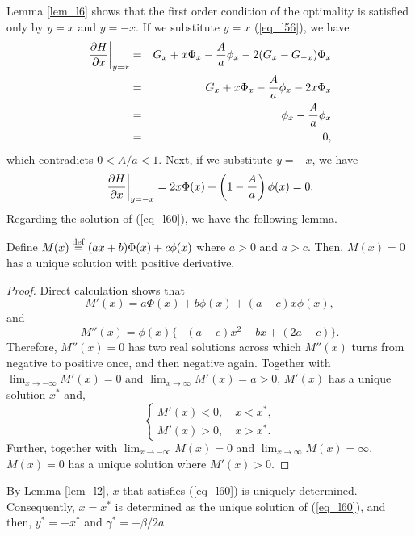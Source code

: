 Lemma \ref{lem_l6} shows that the first order condition of the optimality is satisfied only by $y=x$ and $y=-x$.  If we substitute $y=x$ (\ref{eq_l56}), we have
\begin{eqnarray*}
 \left. \frac{\partial H}{\partial x} \right|_{y=x}
  & = & G_x + x \Phi_x - \frac{A}{a} \phi_x - 2 ( G_x - G_{-x} ) \Phi_x \\
  & = & G_x + x \Phi_x - \frac{A}{a} \phi_x - 2 x\Phi_x \\
  & = & \phi_x - \frac{A}{a} \phi_x \\
  & = & 0,
\end{eqnarray*}
which contradicts $0<A/a<1$.  Next, if we substitute $y=-x$, we have
\begin{equation}\label{eq_l60}
  \left. \frac{\partial H}{\partial x} \right|_{y=-x} = 2 x \Phi(x) + \left( 1 - \frac{A}{a} \right) \phi(x) = 0.
\end{equation}
Regarding the solution of (\ref{eq_l60}), we have the following lemma.
\begin{lemma}\label{lem_l2}
 \quad Define $M(x) \stackrel{\mathrm{def}}{=} (ax+b)\Phi(x)+c\phi(x)$ where $a>0$ and $a>c$.  Then, $M(x)=0$ has a unique solution with positive derivative.
\end{lemma}
\begin{proof}
Direct calculation shows that
\[ %
  M'(x)=a\Phi(x)+b\phi(x)+(a-c)x\phi(x),
\] %
and
\[ %
  M''(x)=\phi(x)\{-(a-c)x^2-bx+(2a-c)\}.
\] %
Therefore, $M''(x)=0$ has two real solutions across which $M''(x)$ turns from negative to positive once, and then negative again.  Together with $\displaystyle \lim_{x \to -\infty} M'(x) =0$ and $\displaystyle \lim_{x \to \infty} M'(x) = a>0$, $M'(x)$ has a unique solution $x^*$ and,
\begin{equation} \label{eq_l63}
 \left\{
  \begin{array}{ll}
   M'(x)<0, \quad x<x^*, \\
   M'(x)>0, \quad x>x^*.
  \end{array}
  \right.
\end{equation}
Further, together with $\displaystyle \lim_{x \to -\infty} M(x) =0$ and $\displaystyle \lim_{x \to \infty} M(x) = \infty$, $M(x)=0$ has a unique solution where $M'(x)>0$.
\end{proof}

By Lemma \ref{lem_l2}, $x$ that satisfies (\ref{eq_l60}) is uniquely determined.  Consequently, $x=x^*$ is determined as the unique solution of (\ref{eq_l60}), and then, $y^* = -x^*$ and $\gamma^* = -\beta/2a$.

